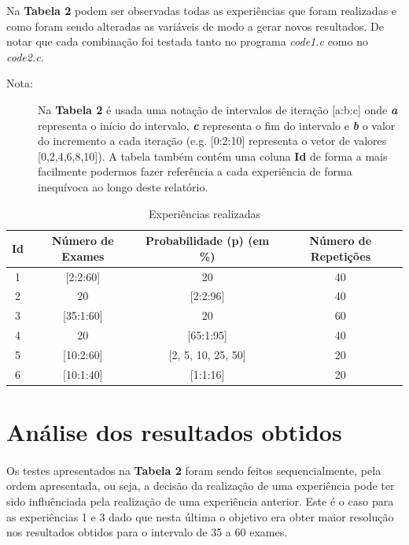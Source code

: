 \documentclass{article}
\begin{document}
Na \textbf{Tabela 2} podem ser observadas todas as experiências que foram realizadas e como foram sendo alteradas as variáveis de modo a gerar novos resultados. De notar que cada combinação foi testada tanto no programa \textit{code1.c} como no \textit{code2.c}.\par
\begin{description}
   \item[Nota:] Na \textbf{Tabela 2} é usada uma notação de intervalos de iteração [a:b:c] onde \textbf{\textit{a}} representa o início do intervalo, \textbf{\textit{c}} representa o fim do intervalo e \textbf{\textit{b}} o valor do incremento a cada iteração (e.g. [0:2:10] representa o vetor de valores [0,2,4,6,8,10]). A tabela também contém uma coluna \textbf{Id} de forma a mais facilmente podermos fazer referência a cada experiência de forma inequívoca ao longo deste relatório.
\end{description}

\begin{table}[h]
\centering
\begin{tabular}{| c | c | c | c |}\hline

\textbf{Id} & \textbf{Número de Exames} & \textbf{Probabilidade (p) (em \%)} &  \textbf{Número de Repetições} \\ \hline                              

1 & [2:2:60] & 20 & 40\\ \hline

2 & 20 & [2:2:96] & 40\\ \hline

3 & [35:1:60] & 20 & 60\\ \hline

4 & 20 & [65:1:95] & 40\\ \hline

5 & [10:2:60] & [2, 5, 10, 25, 50] & 20\\ \hline

6 & [10:1:40] & [1:1:16] & 20\\ \hline

\end{tabular}
\caption{Experiências realizadas}
\end{table}

\section{Análise dos resultados obtidos}
\paragraph{}
Os testes apresentados na \textbf{Tabela 2} foram sendo feitos sequencialmente, pela ordem apresentada, ou seja, a decisão da realização de uma experiência pode ter sido influênciada pela realização de uma experiência anterior. Este é o caso para as experiências 1 e 3 dado que nesta última o objetivo era obter maior resolução nos resultados obtidos para o intervalo de 35 a 60 exames.\par
\end{document}
